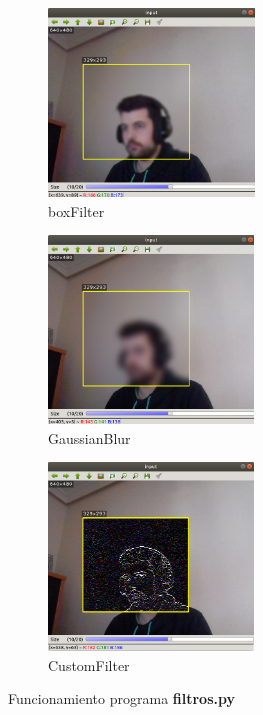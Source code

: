 \documentclass[a4paper]{article} %
\begin{document}
\begin{figure}[h]
    \begin{subfigure}{0.35\textwidth}
        \includegraphics[width=0.9\linewidth, height=5cm]{imagenes/boxFilter.png} 
        \caption{boxFilter}
        \label{fig:boxFilter}
    \end{subfigure}
    \begin{subfigure}{0.35\textwidth}
        \includegraphics[width=0.9\linewidth, height=5cm]{imagenes/gaussian.png}
        \caption{GaussianBlur}
        \label{fig:Gaussian}
    \end{subfigure}
    \begin{subfigure}{0.35\textwidth}
        \includegraphics[width=0.9\linewidth, height=5cm]{imagenes/custom.png}
        \caption{CustomFilter}
        \label{fig:custom}
    \end{subfigure}

    \caption{Funcionamiento programa \textbf{filtros.py}}
    \label{fig:filtros}
\end{figure}
\end{document}
